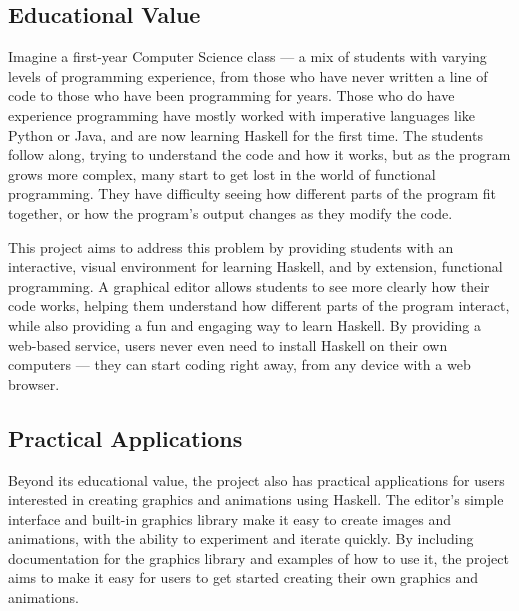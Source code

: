 \documentclass[../main.tex]{subfiles}
\begin{document}
        \subsection{Educational Value}
            Imagine a first-year Computer Science class — a mix of students with varying
                levels of programming experience, from those who have never written a line of
                code to those who have been programming for years.
            Those who do have experience programming have mostly worked with imperative
                languages like Python or Java, and are now learning Haskell for the first time.
            The students follow along, trying to understand the code and how it works, but
                as the program grows more complex, many start to get lost in the world of
                functional programming.
            They have difficulty seeing how different parts of the program fit together, or
                how the program's output changes as they modify the code.

            This project aims to address this problem by providing students with an
                interactive, visual environment for learning Haskell, and by extension,
                functional programming.
            A graphical editor allows students to see more clearly how their code works,
                helping them understand how different parts of the program interact, while also
                providing a fun and engaging way to learn Haskell.
            By providing a web-based service, users never even need to install Haskell on
                their own computers — they can start coding right away, from any device with a
                web browser.

        \subsection{Practical Applications}
            Beyond its educational value, the project also has practical applications for
                users interested in creating graphics and animations using Haskell.
            The editor's simple interface and built-in graphics library make it easy to
                create images and animations, with the ability to experiment and iterate
                quickly.
            By including documentation for the graphics library and examples of how to use
                it, the project aims to make it easy for users to get started creating their
                own graphics and animations.
\end{document}
